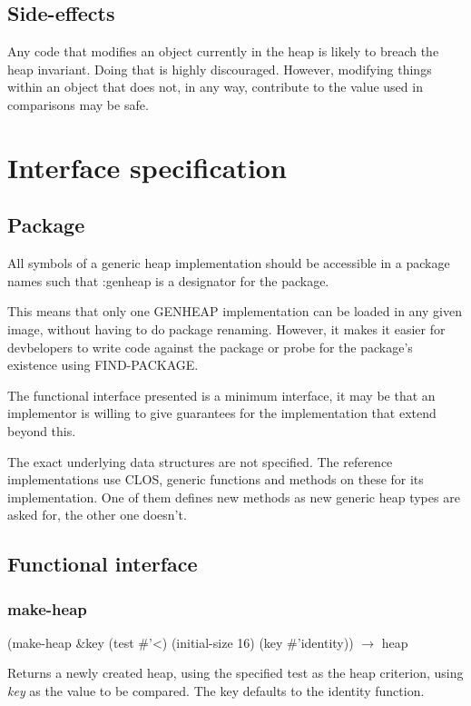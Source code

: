 \documentclass{report}
\begin{document}
\subsection{Side-effects}

Any code that modifies an object currently in the heap is likely to
breach the heap invariant. Doing that is highly discouraged. However,
modifying things within an object that does not, in any way,
contribute to the value used in comparisons may be safe.
 
\section{Interface specification}
 \subsection{Package}
 All symbols of a generic heap implementation should be accessible in
 a package names such that :genheap is a designator for the
 package.

 This means that only one GENHEAP implementation can be loaded in any
 given image, without having to do package renaming. However, it makes
 it easier for devbelopers to write code against the package or probe
 for the package's existence using FIND-PACKAGE.

 The functional interface presented is a minimum interface, it may be
 that an implementor is willing to give guarantees for the
 implementation that extend beyond this.

 The exact underlying data structures are not specified. The reference
 implementations use CLOS, generic functions and methods on these for
 its implementation. One of them defines new methods as new generic
 heap types are asked for, the other one doesn't.

 \subsection{Functional interface}
 \subsubsection{make-heap}
   (make-heap \&key (test \#'<) (initial-size 16) (key \#'identity)) $\rightarrow$ heap

 Returns a newly created heap, using the specified test as the heap
 criterion, using {\sl key} as the value to be compared. The key
 defaults to the identity function.
\end{document}
